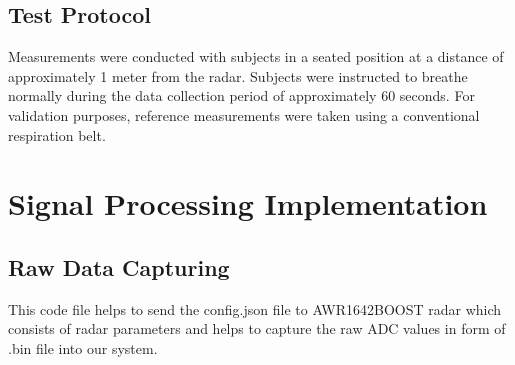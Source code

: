 \documentclass[12pt]{article}
\begin{document}
\subsection{Test Protocol}
Measurements were conducted with subjects in a seated position at a distance of approximately 1 meter from the radar. Subjects were instructed to breathe normally during the data collection period of approximately 60 seconds. For validation purposes, reference measurements were taken using a conventional respiration belt.

\section{Signal Processing Implementation}

\subsection{Raw Data Capturing}
This code file helps to send the config.json file to AWR1642BOOST radar which consists of radar parameters and helps to capture the raw ADC values in form of .bin file into our system.
\end{document}
